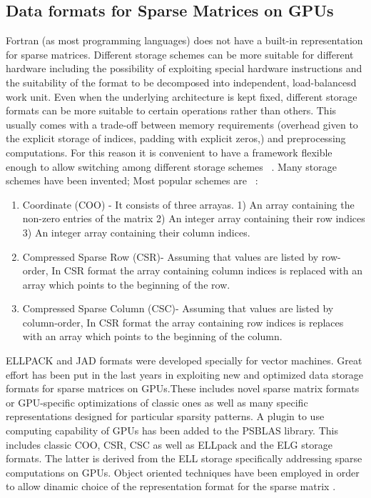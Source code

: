\documentclass[conference]{IEEEtran}
\begin{document}
\subsection{Data formats for Sparse Matrices on GPUs}
Fortran (as most programming languages) does not have a built-in representation for sparse matrices. Different storage schemes can be more suitable for different hardware including the possibility of exploiting special hardware instructions and the suitability of the format to be decomposed into independent, load-balancesd work unit. Even when the underlying architecture is kept fixed, different storage formats can be  more suitable to certain operations rather than others. This usually comes with a trade-off between memory requirements (overhead given to the explicit storage of indices, padding with explicit zeros,) and preprocessing computations. For this reason it is convenient to have a framework flexible enough to allow switching among different storage schemes ~\cite{cardellini2014design}. 
Many storage schemes have been invented; Most popular schemes are ~\cite{saad2003iterative}:

\begin{enumerate}
\item Coordinate (COO) - It consists of three arrayas. 1) An array containing the non-zero entries of the matrix 2) An integer array containing their row indices 3) An integer array containing their column indices.
\item Compressed Sparse Row (CSR)- Assuming that values are listed by row-order, In CSR format the array containing column indices is replaced with an array which points to the beginning of the row.
\item Compressed Sparse Column (CSC)- Assuming that values are listed by column-order, In CSR format the array containing row indices is replaces with an array which points to the beginning of the column. 
\end{enumerate}
ELLPACK and JAD formats were developed specially for vector machines. 
Great effort has been put in the last years in exploiting new and optimized data storage formats for sparse matrices on GPUs.These includes novel sparse matrix formats or GPU-specific optimizations of classic ones as well as many specific representations designed for particular sparsity patterns. 
A plugin to use computing capability of GPUs has been added to the PSBLAS library. This includes classic COO, CSR, CSC as well as ELLpack and the ELG storage formats. The latter is derived from the ELL storage specifically addressing sparse computations on GPUs. Object oriented techniques have been employed in order to allow dinamic choice of the representation format for the sparse matrix .  
 
\end{document}
